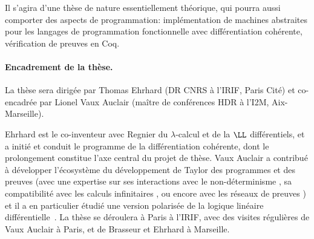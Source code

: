 \documentclass[a4]{article}
\begin{document}
Il s'agira d'une thèse de nature essentiellement théorique, qui pourra
aussi comporter des aspects de programmation: implémentation de
machines abstraites pour les langages de programmation fonctionnelle
avec différentiation cohérente, vérification de preuves en Coq.


\paragraph*{Encadrement de la thèse.}
La thèse sera dirigée par Thomas Ehrhard (DR CNRS à l’IRIF, Paris
Cité) et co-encadrée par Lionel Vaux Auclair (maître de conférences HDR à
l’I2M, Aix-Marseille).

Ehrhard est le co-inventeur avec Regnier du $\lambda$-calcul et de la $\LL$
différentiels, et a initié et conduit le programme de la différentiation
cohérente, dont le prolongement constitue l’axe central du projet de thèse.
Vaux Auclair a contribué à développer l’écosystème du développement de Taylor
des programmes et des preuves (avec une expertise sur ses interactions avec le
non-déterminisme \cite{Vaux19}, sa compatibilité avec les calculs infinitaires
\cite{CerdaVaux23}, 
ou encore avec les réseaux de preuves \cite{ChouquetVaux21}) et il a en particulier étudié une
version polarisée de la logique linéaire diffé\-ren\-tielle~\cite{Vaux09a}.
%
La thèse se déroulera à Paris à l’IRIF, avec des visites régulières de Vaux
Auclair à Paris, et de Brasseur et Ehrhard à Marseille.



\end{document}
